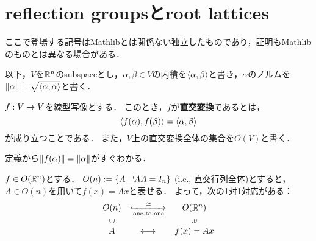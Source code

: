 %

\setcounter{section}{1}
\section{reflection groupsとroot lattices}

ここで登場する記号はMathlibとは関係ない独立したものであり，証明もMathlibのものとは異なる場合がある．

以下，$V$を$\mathbb{R}^n$のsubspaceとし，$\alpha, \beta \in V$の内積を$\left\langle \alpha, \beta \right\rangle$と書き，$\alpha$のノルムを$\left\| \alpha \right\| = \sqrt{\left\langle \alpha, \alpha \right\rangle}$と書く．
\begin{defi}
  \label{def:orthogonal_transformation}
  $f : V \rightarrow V$を線型写像とする．
  このとき，$f$が\textbf{直交変換}であるとは，
  \begin{equation}
    \left\langle f(\alpha), f(\beta) \right\rangle = \left\langle \alpha, \beta \right\rangle
  \end{equation}
  が成り立つことである．
  また，$V$上の直交変換全体の集合を$O(V)$と書く．
\end{defi}

\begin{rem}
  \label{rem:orthogonal_transformation_norm}
  \leanok
  定義から$\left\| f(\alpha) \right\| = \left\| \alpha \right\|$がすぐわかる．
\end{rem}

\begin{rem}
  \label{rem:orthogonal_transformation_one-to-one}
  $f \in O(\mathbb{R}^n)$とする．
  $O(n) := \left\lbrace A \mathrel{} \middle| \mathrel{} {}^t\!A A = I_n \right\rbrace$ (i.e., 直交行列全体)とすると，$A \in O(n)$を用いて$f(x) = Ax$と表せる．
  よって，次の1対1対応がある：
  \begin{equation}
    \begin{array}{ccc}
    O(n) & \xleftrightarrow[\text{one-to-one}]{\simeq}  & O(\R^n) \\
    \rotatebox[origin=c]{90}{$\in$} & & \rotatebox[origin=c]{90}{$\in$} \\
    A & \longleftrightarrow & f(x) = Ax
    \end{array}
  \end{equation}
\end{rem}

